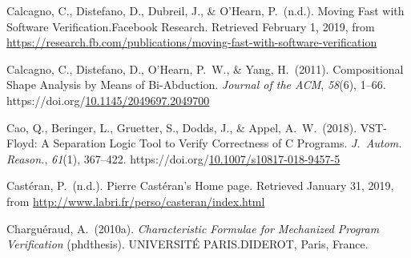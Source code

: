 \documentclass[12pt,twoside]{article}
\begin{document}
{\begin{thebibliography}{222}
\mdbibitemlabel{}Calcagno, C., Distefano, D., Dubreil, J., \& O’Hearn, P.~(n.d.). Moving Fast with Software Verification.Facebook Research. Retrieved February 1, 2019, from \href{https://research.fb.com/publications/moving-fast-with-software-verification}{{\ttfamily https://\hspace{0pt}research.\hspace{0pt}fb.\hspace{0pt}com/\hspace{0pt}publications/\hspace{0pt}moving-\hspace{0pt}fast-\hspace{0pt}with-\hspace{0pt}software-\hspace{0pt}verification}}\label{calcagno_moving_nodate}%

\mdbibitemlabel{}Calcagno, C., Distefano, D., O’Hearn, P.~W., \& Yang, H.~(2011). Compositional Shape Analysis by Means of Bi-Abduction. \emph{Journal of the ACM}, \emph{58}(6), 1–66. https://doi.org/\href{https://dx.doi.org/10.1145/2049697.2049700}{10.1145/2049697.2049700}\label{calcagno_compositional_2011}%

\mdbibitemlabel{}Cao, Q., Beringer, L., Gruetter, S., Dodds, J., \& Appel, A.~W.~(2018). VST-Floyd: A Separation Logic Tool to Verify Correctness of C Programs. \emph{J.~Autom. Reason.}, \emph{61}(1), 367–422. https://doi.org/\href{https://dx.doi.org/10.1007/s10817-018-9457-5}{10.1007/s10817-018-9457-5}\label{cao_vst-floyd:_2018}%

\mdbibitemlabel{}Castéran, P.~(n.d.). Pierre Castéran’s Home page. Retrieved January 31, 2019, from \href{http://www.labri.fr/perso/casteran/index.html}{{\ttfamily http://\hspace{0pt}www.\hspace{0pt}labri.\hspace{0pt}fr/\hspace{0pt}perso/\hspace{0pt}casteran/\hspace{0pt}index.\hspace{0pt}html}}\label{casteran_pierre_nodate}%

\mdbibitemlabel{}Charguéraud, A.~(2010a). \emph{Characteristic Formulae for Mechanized Program Verification} (phdthesis). UNIVERSITÉ PARIS.DIDEROT, Paris, France.\label{chargueraud_characteristic_2010}%


\end{thebibliography}}
\end{document}
